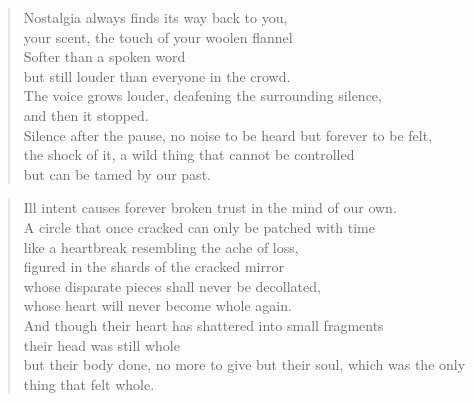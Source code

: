 \vfill

\clearpage

\begin{verse}
    Nostalgia always finds its way back to you,\\
    your scent, the touch of your woolen flannel\\
    Softer than a spoken word\\
    but still louder than everyone in the crowd.\\
    The voice grows louder, deafening the surrounding silence,\\
    and then it stopped.\\
    Silence after the pause, no noise to be heard but forever to be felt,\\
    the shock of it, a wild thing that cannot be controlled\\
    but can be tamed by our past.\\    
\end{verse}

\vfill

\begin{verse}
    Ill intent causes forever broken trust in the mind of our own.\\
    A circle that once cracked can only be patched with time\\
    like a heartbreak resembling the ache of loss,\\
    figured in the shards of the cracked mirror\\
    whose disparate pieces shall never be decollated,\\
    whose heart will never become whole again.\\
    And though their heart has shattered into small fragments\\
    their head was still whole\\
    but their body done, no more to give but their soul, which was the only thing that felt whole.\\
\end{verse}

\vfill

\clearpage


